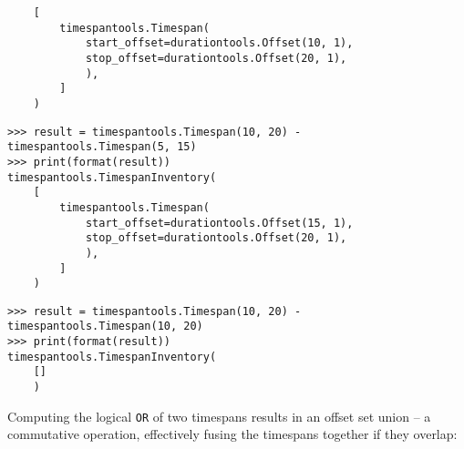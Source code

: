 \begin{abjadbookoutput}
\begin{singlespacing}
\begin{verbatim}
    [
        timespantools.Timespan(
            start_offset=durationtools.Offset(10, 1),
            stop_offset=durationtools.Offset(20, 1),
            ),
        ]
    )
\end{verbatim}
\begin{verbatim}
>>> result = timespantools.Timespan(10, 20) - timespantools.Timespan(5, 15)
>>> print(format(result))
timespantools.TimespanInventory(
    [
        timespantools.Timespan(
            start_offset=durationtools.Offset(15, 1),
            stop_offset=durationtools.Offset(20, 1),
            ),
        ]
    )
\end{verbatim}
\begin{verbatim}
>>> result = timespantools.Timespan(10, 20) - timespantools.Timespan(10, 20)
>>> print(format(result))
timespantools.TimespanInventory(
    []
    )
\end{verbatim}
\end{singlespacing}
\end{abjadbookoutput}

\noindent Computing the logical \texttt{OR} of two timespans results in an
offset set union -- a commutative operation, effectively fusing the timespans
together if they overlap:

\begin{comment}
<abjad>
result = timespantools.Timespan(0, 10) | timespantools.Timespan(5, 15)
print(format(result))
result = timespantools.Timespan(0, 10) | timespantools.Timespan(10, 20)
print(format(result))
result = timespantools.Timespan(5, 15) | timespantools.Timespan(10, 20)
print(format(result))
</abjad>
\end{comment}

